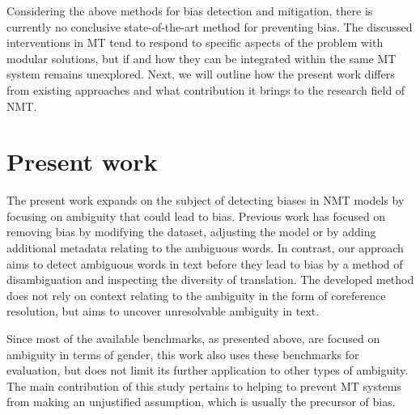\newpage

Considering the above methods for bias detection and mitigation, there is currently no conclusive state-of-the-art method for preventing bias. The discussed interventions in MT tend to respond to specific aspects of the problem with modular solutions, but if and how they can be integrated within the same MT system remains unexplored. Next, we will outline how the present work differs from existing approaches and what contribution it brings to the research field of NMT.

 



\section{Present work}
\label{sec:Related_work:Present_work}

The present work expands on the subject of detecting biases in NMT models by focusing on ambiguity that could lead to bias. Previous work has focused on removing bias by modifying the dataset, adjusting the model or by adding additional metadata relating to the ambiguous words. In contrast, our approach aims to detect ambiguous words in text before they lead to bias by a method of disambiguation and inspecting the diversity of translation. The developed method does not rely on context relating to the ambiguity in the form of coreference resolution, but aims to uncover unresolvable ambiguity in text. 

Since most of the available benchmarks, as presented above, are focused on ambiguity in terms of gender, this work also uses these benchmarks for evaluation, but does not limit its further application to other types of ambiguity. The main contribution of this study pertains to helping to prevent MT systems from making an unjustified assumption, which is usually the precursor of bias.

